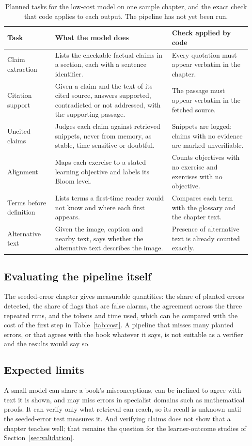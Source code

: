 \begin{table}[htbp]
\centering
\caption{Planned tasks for the low-cost model on one sample chapter, and the exact check that code applies to each output. The pipeline has not yet been run.}
\label{tab:nextstep}
\small
\begin{tabular}{@{}L{3.0cm}L{5.8cm}L{5.0cm}@{}}
\toprule
Task & What the model does & Check applied by code \\
\midrule
Claim extraction & Lists the checkable factual claims in a section, each with a sentence identifier. & Every quotation must appear verbatim in the chapter. \\
Citation support & Given a claim and the text of its cited source, answers supported, contradicted or not addressed, with the supporting passage. & The passage must appear verbatim in the fetched source. \\
Uncited claims & Judges each claim against retrieved snippets, never from memory, as stable, time-sensitive or doubtful. & Snippets are logged; claims with no evidence are marked unverifiable. \\
Alignment & Maps each exercise to a stated learning objective and labels its Bloom level. & Counts objectives with no exercise and exercises with no objective. \\
Terms before definition & Lists terms a first-time reader would not know and where each first appears. & Compares each term with the glossary and the chapter text. \\
Alternative text & Given the image, caption and nearby text, says whether the alternative text describes the image. & Presence of alternative text is already counted exactly. \\
\bottomrule
\end{tabular}
\end{table}

\subsection{Evaluating the pipeline itself}
The seeded-error chapter gives measurable quantities: the share of planted errors detected, the share of flags that are false alarms, the agreement across the three repeated runs, and the tokens and time used, which can be compared with the cost of the first step in Table~\ref{tab:cost}. A pipeline that misses many planted errors, or that agrees with the book whatever it says, is not suitable as a verifier and the results would say so.

\subsection{Expected limits}
A small model can share a book's misconceptions, can be inclined to agree with text it is shown, and may miss errors in specialist domains such as mathematical proofs. It can verify only what retrieval can reach, so its recall is unknown until the seeded-error test measures it. And verifying claims does not show that a chapter teaches well; that remains the question for the learner-outcome studies of Section~\ref{sec:validation}.
